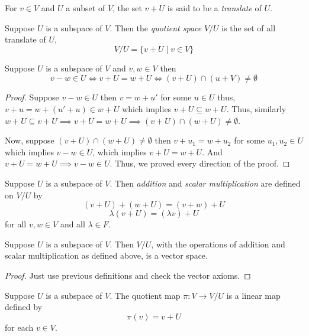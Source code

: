 \begin{definition}
    For $v \in V$ and $U$ a subset of $V$, the set $v+U$ is said to be a \textit{translate} of $U$.
\end{definition}

\begin{definition}
    Suppose $U$ is a subspace of $V$. Then the \textit{quotient space} $V/U$ is the set of all translate of $U$,
    \[ V/U = \{ v+ U \mid v \in V \} \]
\end{definition}

\begin{proposition}
    Suppose $U$ is a subspace of $V$ and $v,w \in V$ then
    \[ v-w \in U \iff v+U = w + U \iff (v+U) \cap (u+V) \neq \emptyset \] 
\end{proposition}

\begin{proof}
    Suppose $v-w \in U$ then $v=w+u'$ for some $u \in U$ thus, $v+u = w+(u'+u) \in w + U$ which implies $v+U \subseteq w+U$.
    Thus, similarly $w+U \subseteq v+U \implies v+U = w+U \implies (v+U) \cap (w+U) \neq \emptyset$.

    Now, suppose $(v+U) \cap (w+U) \neq \emptyset$ then $v+u_1 = w+u_2$ for some $u_1,u_2 \in U$ which implies $v-w \in U$, which implies 
    $v+U=w+U$. And $v+U = w+U \implies v-w \in U$. Thus, we proved every direction of the proof.
\end{proof}

\begin{definition}
    Suppose $U$ is a subspace of $V$. Then \textit{addition} and \textit{scalar multiplication} are defined on $V/U$ by
    \[ (v+U)+(w+U) = (v+w)+U\]
    \[ \lambda(v+U) = (\lambda v) + U \]
    for all $v, w \in V$ and all $\lambda \in F$.
\end{definition}

\begin{proposition}
    Suppose $U$ is a subspace of $V$. Then $V/U$, with the operations of addition and scalar multiplication as defined above, is a vector
    space.
\end{proposition}

\begin{proof}
    Just use previous definitions and check the vector axioms. 
\end{proof}

\begin{definition}
    Suppose $U$ is a subspace of $V$. The quotient map $\pi : V \to V/U$ is a linear map defined by 
    \[ \pi(v) = v+U \]
    for each $v \in V$.
\end{definition}


